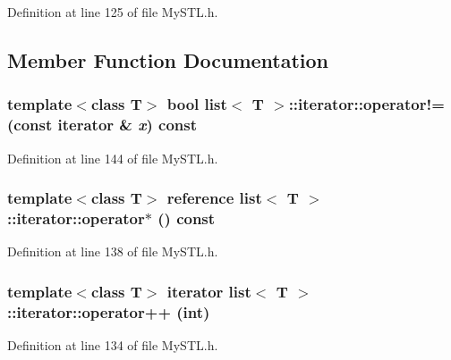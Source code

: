 Definition at line 125 of file MySTL.h.



\subsection{Member Function Documentation}
\subsubsection[{operator!=}]{\setlength{\rightskip}{0pt plus 5cm}template$<$class T$>$ bool {\bf list}$<$ T $>$::iterator::operator!= (const {\bf iterator} \& {\em x}) const}\label{classlist_1_1iterator_a9874b68c0518c6261a8e6d7b6f5e1992}


Definition at line 144 of file MySTL.h.

\subsubsection[{operator$\ast$}]{\setlength{\rightskip}{0pt plus 5cm}template$<$class T$>$ {\bf reference} {\bf list}$<$ T $>$::iterator::operator$\ast$ () const}\label{classlist_1_1iterator_aef3344fdc48292642e8e869fcea51297}


Definition at line 138 of file MySTL.h.

\subsubsection[{operator++}]{\setlength{\rightskip}{0pt plus 5cm}template$<$class T$>$ {\bf iterator} {\bf list}$<$ T $>$::iterator::operator++ (int)}\label{classlist_1_1iterator_a54581e2941db9fcf50e2553fe6e70140}


Definition at line 134 of file MySTL.h.

